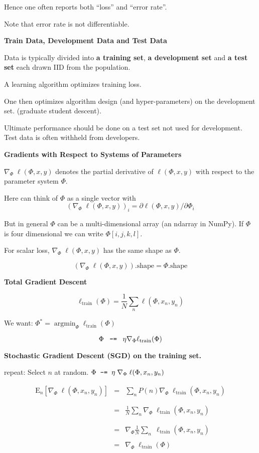 \documentclass[landscape]{article}
\newcommand{\slide}[1]{
  \vfill
  \centerline{\Large\thepage}
  \eject
  \centerline{\bf #1}
  \vfill}
\DeclareMathOperator*{\argmin}{argmin}
\newcommand{\expectsub}[2]{\mathrm{E}_{#1}\left[#2\right]}
\newcommand{\minuseq}{\mbox{\tt -=}}
\begin{document}
{\vfill
Hence one often reports both ``loss'' and ``error rate''.

\vfill
Note that error rate is not differentiable.

\slide{Train Data, Development Data and Test Data}

Data is typically divided into {\bf a training set}, {\bf a development set} and {\bf a test set} each drawn IID from the population.

\vfill
A learning algorithm optimizes training loss.

\vfill
One then optimizes algorithm design (and hyper-parameters) on the development set. (graduate student descent).

\vfill
Ultimate performance should be done on a test set not used for development.  Test data is often withheld from developers.

\slide{Gradients with Respect to Systems of Parameters}

$\nabla_\Phi\;\ell(\Phi,x,y)$ denotes the partial derivative of $\ell(\Phi,x,y)$ with respect to the parameter system $\Phi$.

\vfill
Here can think of $\Phi$ as a single vector with
$$(\nabla_\Phi \;\ell(\Phi,x,y))_i = \partial \ell(\Phi,x,y) /\partial \Phi_i$$

\vfill
But in general $\Phi$ can be a multi-dimensional array (an ndarray in NumPy). If $\Phi$ is four dimensional we can write $\Phi[i,j,k,l]$.

\vfill
For scalar loss, $\nabla_\Phi \;\ell(\Phi,x,y)$ has the same shape as $\Phi$.

\vfill
$$\left(\nabla_\Phi \;\ell(\Phi,x,y)\right).\mathrm{shape} = \Phi.\mathrm{shape}$$

\slide{Total Gradient Descent}

$$\ell_{\mathrm{train}}(\Phi) = \frac{1}{N}\sum_n \ell(\Phi,x_n,y_n)$$

\vfill
\centerline{We want: \hspace{3ex} $\Phi^*  =  \argmin_\Phi \ell_{\mathrm{train}}(\Phi)$}

\vfill
$$\Phi \;\;\;\mbox{\tt -=}\;\;\; \eta \nabla_\Phi \ell_\mathrm{train}(\Phi)$$

\slide{Stochastic Gradient Descent (SGD) on the training set.}

\vfill
\vfill
repeat:  Select $n$ at random. $\Phi \;\;\minuseq\;\; \eta \;\nabla_\Phi \; \ell(\Phi,x_n,y_n)$

\begin{eqnarray*}
  \expectsub{n}{\nabla_\Phi \; \ell(\Phi,x_n,y_n)} & = & \sum_n P(n) \nabla_\Phi\;\ell_{\mathrm{train}}(\Phi,x_n,y_n) \\
  \\
  \\ & = & \frac{1}{N} \sum_n \nabla_\Phi\;\ell_{\mathrm{train}}(\Phi,x_n,y_n) \\
  \\
    \\ & = & \nabla_\Phi \frac{1}{N} \sum_n \;\ell_{\mathrm{train}}(\Phi,x_n,y_n) \\
  \\
  &  = & \nabla_\Phi\;\ell_{\mathrm{train}}(\Phi)
\end{eqnarray*}



}
\end{document}

